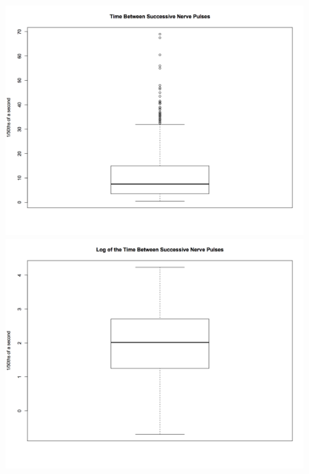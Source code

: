 \documentclass[a4paper]{article}
\begin{document}
\begin{enumerate}
\begin{enumerate}
		\begin{figure}[!htb]
		    \centering
		    \begin{minipage}{0.5\textwidth}
		        \centering
		        \includegraphics[width=\linewidth, height=0.27\textheight]{data.png}
		    \end{minipage}%
		    \begin{minipage}{0.5\textwidth}
		        \centering
		        \includegraphics[width=\linewidth, height=0.27\textheight]{logdata.png}
		    \end{minipage}
		\end{figure}


\end{enumerate}
\end{enumerate}
\end{document}
